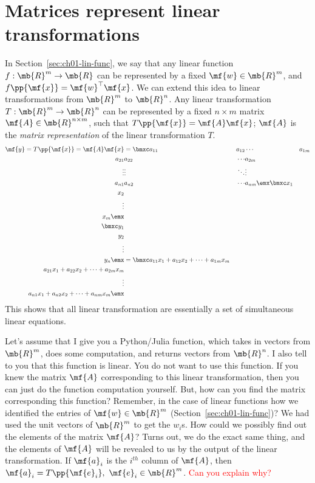 \section{Matrices represent linear transformations}\label{sec:ch03-mat-lin-trans}
In Section~\ref{sec:ch01-lin-func}, we say that any linear function $f: \mb{R}^m \to \mb{R}$ can be represented by a fixed $\mf{w} \in \mb{R}^m$, and $f\pp{\mf{x}} = \mf{w}^\top\mf{x}$. We can extend this idea to linear transformations from $\mb{R}^m$ to $\mb{R}^n$. Any linear transformation $T: \mb{R}^m \to \mb{R}^n$ can be represented by a fixed $n \times m$ matrix $\mf{A} \in \mb{R}^{n \times m}$, such that $T\pp{\mf{x}} = \mf{A}\mf{x}$; $\mf{A}$ is the \textit{matrix representation} of the linear transformation $T$.
\begin{equation}
    \begin{split}
        \mf{y} = T\pp{\mf{x}} = \mf{A}\mf{x} &= \bmxc a_{11} & a_{12} & \cdots & a_{1m}\\ a_{21} & a_{22} & \cdots & a_{2m}\\ \vdots & \vdots & \ddots & \vdots\\ a_{n1} & a_{n2} & \cdots & a_{nm} \emx \bmxc x_1 \\ x_2 \\ \vdots \\ x_m\emx \\
        \bmxc y_1 \\ y_2 \\ \vdots \\ y_n \emx &= \bmxc a_{11}x_1 + a_{12}x_2 + \cdots + a_{1m}x_m \\ 
        a_{21}x_1 + a_{22}x_2 + \cdots + a_{2m}x_m \\
        \vdots \\
        a_{n1}x_1 + a_{n2}x_2 + \cdots + a_{nm}x_m\emx 
    \end{split}
    \label{eq:ch03-lin-trans-mat-rep}
\end{equation}
This shows that all linear transformation are essentially a set of simultaneous linear equations.

Let's assume that I give you a Python/Julia function, which takes in vectors from $\mb{R}^m$, does some computation, and returns vectors from $\mb{R}^n$. I also tell to you that this function is linear. You do not want to use this function. If you knew the matrix $\mf{A}$ corresponding to this linear transformation, then you can just do the function computation yourself. But, how can you find the matrix corresponding this function? Remember, in the case of linear functions how we identified the entries of $\mf{w} \in \mb{R}^m$ (Section~\ref{sec:ch01-lin-func})? We had used the unit vectors of $\mb{R}^m$ to get  the $w_i$s. How could we possibly find out the elements of the matrix $\mf{A}$? Turns out, we do the exact same thing, and the elements of $\mf{A}$ will be revealed to us by the output of the linear transformation. If $\mf{a}_i$ is the $i^{th}$ column of $\mf{A}$, then 
$\mf{a}_i = T\pp{\mf{e}_i}, \,\, \mf{e}_i \in \mb{R}^m$. \textcolor{red}{Can you explain why?}

